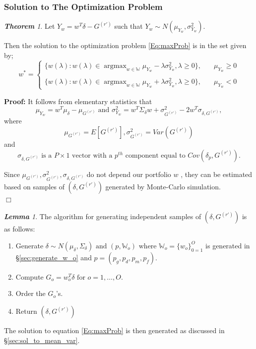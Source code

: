 \documentclass[12pt,oneside,a4paper]{book}
\theoremstyle{definition}
\theoremstyle{remark}
\newenvironment{prf}[0]{\textbf{Proof:}}{\hfill$\Box$}
\newtheorem{thm}{\bf Theorem}[subsection]
\newtheorem{lem}{\bf Lemma}[section]
\DeclareMathOperator*{\argmax}{argmax}
\begin{document}
				\subsubsection{Solution to The Optimization Problem}
					\begin{thm} \label{thm:solution_to_opt_prob}
						Let $Y_w = w^T\delta - G^{(r')}$ such that $Y_w \sim N(\mu_{Y_w}, \sigma^2_{Y_w}).$

						Then the solution to the optimization problem \ref{Eq:maxProb} is in the set given by;
						\begin{equation}
							w^* =  {\begin{cases}
								{
									\{ w(\lambda):w(\lambda) \in \argmax_{w\in \mathbb{W}} \mu_{Y_w} - \lambda \sigma^2_{Y_w}, \lambda \ge0 \}
								}, \quad & \mu_{Y_w} \ge 0  \\\\
								{
									\{ w(\lambda):w(\lambda) \in \argmax_{w\in \mathbb{W}} \mu_{Y_w} + \lambda \sigma^2_{Y_w}, \lambda \ge0 \}
								}, \quad & \mu_{Y_w} < 0
							\end{cases}}
						\end{equation}

						\begin{prf}
							It follows from elementary statistics that
							\[
							\mu_{Y_w} =  w^T\mu_{\delta} - \mu_{G^{(r')}} \text{ and } \sigma^2_{Y_w} = w^T\Sigma_{\delta}w + \sigma^2_{G^{(r')}} - 2w^T\sigma_{\delta, G^{(r')}},
							\]
							where \[
							\mu_{G^{(r')}} = E[G^{(r')}], \sigma^2_{G^{(r')}} = Var(G^{(r')})\] and \[ \sigma_{\delta, G^{(r')}} \text{ is a } P\times 1 \text{ vector with a } p^{th}\text{ component equal to } Cov(\delta_p, G^{(r')}).
							\]

							Since $\mu_{G^{(r')}}, \sigma^2_{G^{(r')}}, \sigma_{\delta, G^{(r')}}$ do not depend our portfolio $w$ , they can be estimated based on samples of $(\delta, G^{(r')})$ generated by Monte-Carlo simulation.\\

						\end{prf}
					\end{thm}

					\begin{lem}	\label{alg:gen_ind} \cite{morton2003optimizing}
						The algorithm for generating independent samples of $(\delta, G^{(r')})$ is as follows:
						\begin{enumerate}
							\item Generate $\delta \sim N(\mu_\delta, \Sigma_\delta) \text{ and } (p,\mathbb{W}_o) \text{ where } \mathbb{W}_o = \{ w_o\}_{0=1}^O$ is generated in \S \ref{sec:generate_w_o} and $p = (p_g, p_d, p_m, p_f)$.
							\item Compute $G_o = w_o^T\delta \text{ for } o = 1, \dots, O.$
							\item Order the $G_o$'s.
							\item Return $(\delta, G^{(r')})$
						\end{enumerate}
					\end{lem}
					The solution to equation \eqref{Eq:maxProb} is then generated as discussed in \S \ref{sec:sol_to_mean_var}.\\
\end{document}
